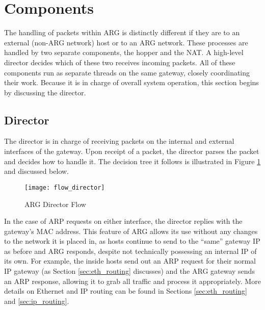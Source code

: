 
\section{Components}
\label{sec:arg_components}
The handling of packets within ARG is distinctly different if they are to an external (non-ARG network) host or to an ARG network. These processes are handled by two separate components, the hopper and the NAT. A high-level director decides which of these two receives incoming packets. All of these components run as separate threads on the same gateway, closely coordinating their work. Because it is in charge of overall system operation, this section begins by discussing the director.

\subsection{Director}
\label{sec:arg_director}
\par The director is in charge of receiving packets on the internal and external interfaces of the gateway. Upon receipt of a packet, the director parses the packet and decides how to handle it. The decision tree it follows is illustrated in Figure \ref{fig:arg_director_flow} and discussed below.

\begin{figure}
\caption{\ac{ARG} Director Flow}
\label{fig:arg_director_flow}
\centering
\texttt{[image: flow\_director]}
\end{figure}

\par In the case of \ac{ARP} requests on either interface, the director replies with the gateway's \ac{MAC} address. This feature of \ac{ARG} allows its use without any changes to the network it is placed in, as hosts continue to send to the ``same'' gateway IP as before and \ac{ARG} responds, despite not technically possessing an internal \ac{IP} of its own. For example, the inside hosts send out an \ac{ARP} request for their normal \ac{IP} gateway (as Section \ref{sec:eth_routing} discusses) and the \ac{ARG} gateway sends an \ac{ARP} response, allowing it to grab all traffic and process it appropriately. More details on Ethernet and \ac{IP} routing can be found in Sections \ref{sec:eth_routing} and \ref{sec:ip_routing}.

